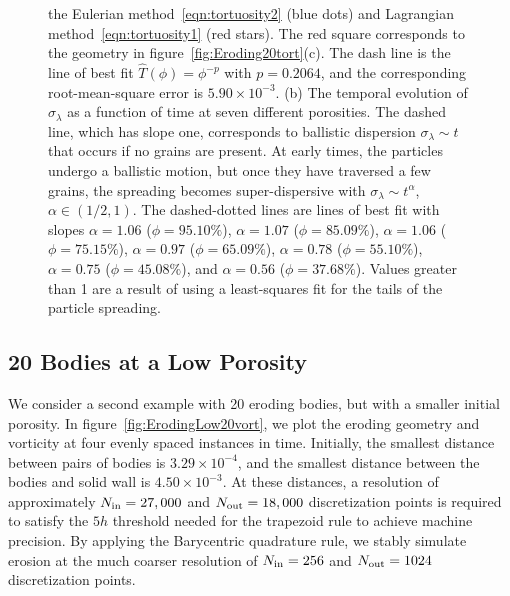 \documentclass{jfm}
\begin{document}
\begin{figure}
{the Eulerian method~\eqref{eqn:tortuosity2} (blue dots) and Lagrangian
method~\eqref{eqn:tortuosity1} (red stars).  The red square corresponds
to the geometry in figure~\ref{fig:Eroding20tort}(c).  The dash line is
the line of best fit $\widehat{T}(\phi)=\phi^{-p}$ with $p=0.2064$, and
the corresponding root-mean-square error is $5.90 \times 10^{-3}$. (b)
The temporal evolution of $\sigma_\lambda$ as a function of time at
seven different porosities.  The dashed line, which has slope one,
corresponds to ballistic dispersion $\sigma_\lambda \sim t$ that occurs
if no grains are present. At early times, the particles undergo a
ballistic motion, but once they have traversed a few grains, the
spreading becomes super-dispersive with $\sigma_\lambda \sim t^\alpha$,
$\alpha \in (1/2,1)$.  The dashed-dotted lines are lines of best fit
with slopes $\alpha = 1.06$ ($\phi=95.10\%$), $\alpha = 1.07$
($\phi=85.09\%$), $\alpha = 1.06$ ($\phi=75.15\%$), $\alpha = 0.97$
($\phi=65.09\%$), $\alpha = 0.78$ ($\phi=55.10\%$), $\alpha = 0.75$
($\phi=45.08\%$), and $\alpha = 0.56$ ($\phi=37.68\%$).  Values greater
than 1 are a result of using a least-squares fit for the tails of the
particle spreading.}
\end{figure}


\subsection{20 Bodies at a Low Porosity}
We consider a second example with 20 eroding bodies, but with a smaller
initial porosity.  In figure~\ref{fig:ErodingLow20vort}, we plot the
eroding geometry and vorticity at four evenly spaced instances in time.
Initially, the smallest distance between pairs of bodies is $3.29 \times
10^{-4}$, and the smallest distance between the bodies and solid wall is
$4.50 \times 10^{-3}$.  At these distances, a resolution of
approximately $N_{\mathrm{in}} = 27,000$ and $N_{\mathrm{out}} = 18,000$ discretization
points is required to satisfy the $5h$ threshold needed for the
trapezoid rule to achieve machine precision.  By applying the
Barycentric quadrature rule, we stably simulate erosion at the much
coarser resolution of $N_{\mathrm{in}} = 256$ and $N_{\mathrm{out}} = 1024$ discretization
points.
\end{document}
